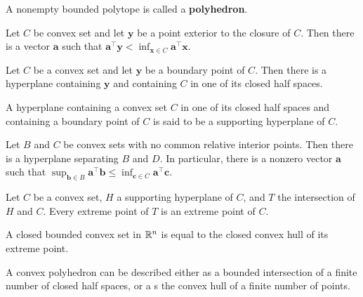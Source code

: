 \begin{definition}
A nonempty bounded polytope is called a \textbf{polyhedron}.
\end{definition}

\begin{theorem}
Let $C$ be convex set and let $\mathbf{y}$ be a point exterior to the closure of $C$. Then there is a vector $\mathbf{a}$ such that $\mathbf{a}^\top \mathbf{y}<\inf_{\mathbf{x}\in C} \mathbf{a}^\top \mathbf{x}$.
\end{theorem}

\begin{theorem}
Let $C$ be a convex set and let $\mathbf{y}$ be a boundary point of $C$. Then there is a hyperplane containing $\mathbf{y}$ and containing $C$ in one of its closed half spaces. 
\end{theorem}

\begin{definition}
A hyperplane containing a convex set $C$ in one of its closed half spaces and containing a boundary point of $C$ is said to be a supporting hyperplane of $C$.
\end{definition}

\begin{theorem}
Let $B$ and $C$ be convex sets with no common relative interior points. Then there is a hyperplane separating $B$ and $D$. In particular, there is a nonzero vector $\mathbf{a}$ such that $\sup_{\mathbf{b}\in B}\mathbf{a}^\top \mathbf{b}\leq \inf_{\mathbf{c}\in C} \mathbf{a}^\top \mathbf{c}$. 
\end{theorem}

\begin{theorem}
	Let $C$ be a convex set, $H$ a supporting hyperplane of $C$, and $T$ the intersection of $H$ and $C$. Every extreme point of $T$ is an extreme point of $C$.
\end{theorem}

\begin{theorem}
A closed bounded convex set in $\mathbb{R}^n$ is equal to the closed convex hull of its extreme point.
\end{theorem}

\begin{theorem}
A convex polyhedron can be described either as a bounded intersection of a finite number of closed half spaces, or a s the convex hull of a finite number of points. 
\end{theorem}